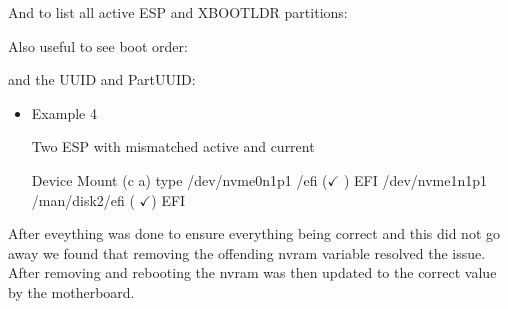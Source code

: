 \documentclass[letterpaper,11pt,english]{sphinxmanual}
\begin{document}
\begin{sphinxVerbatim}[commandchars=\\\{\}]
    
\end{sphinxVerbatim}

\sphinxAtStartPar
And to list all active ESP and XBOOTLDR partitions:

\begin{sphinxVerbatim}[commandchars=\\\{\}]
     
\end{sphinxVerbatim}

\sphinxAtStartPar
Also useful to see boot order:

\begin{sphinxVerbatim}[commandchars=\\\{\}]
\end{sphinxVerbatim}

\sphinxAtStartPar
and the UUID and PartUUID:

\begin{sphinxVerbatim}[commandchars=\\\{\}]
  
\end{sphinxVerbatim}
\begin{itemize}
\item {} 
\sphinxAtStartPar
Example 4

\sphinxAtStartPar
Two ESP with mismatched active and current

\begin{sphinxVerbatim}[commandchars=\\\{\}]
        Device Mount                          (c a) type
/dev/nvme0n1p1 /efi                           (\(\pmb{\checkmark}\)  ) EFI
/dev/nvme1n1p1 /man/disk2/efi                 (  \(\pmb{\checkmark}\)) EFI
\end{sphinxVerbatim}

\end{itemize}

\sphinxAtStartPar
After eveything was done to ensure everything being correct and this  did not go away
we found that removing the offending nvram variable resolved the issue. After removing
and rebooting the nvram was then updated to the correct value by the motherboard.
\end{document}
